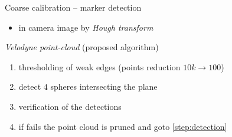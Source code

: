 \documentclass[pdf]{beamer}
\begin{document}
	\begin{frame}{Coarse calibration -- marker detection}
		\begin{itemize}
			\item in camera image by \emph{Hough transform}
		\end{itemize}
		\begin{alertblock}{\emph{Velodyne point-cloud} (proposed algorithm)}
		\begin{enumerate}
			\item thresholding of weak edges (points reduction $10k \rightarrow 100$)
			\item detect $4$ spheres intersecting the plane \label{step:detection}
			\item verification of the detections
			\item if fails the point cloud is pruned and goto \ref{step:detection}
		\end{enumerate}
		\end{alertblock}

		\setcounter{subfigure}{0}
		\begin{figure}[h]
			\centering
			\quad
			\quad
		\end{figure}
	\end{frame}
\end{document}
